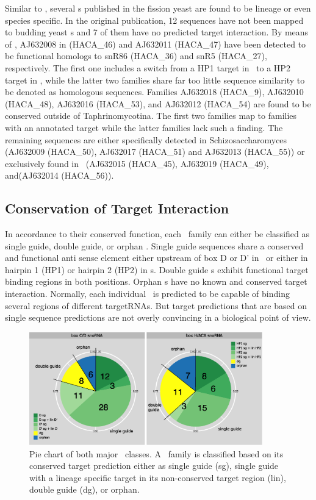 Similar to \calb, several \sno s published in the fission yeast
\cite{Li:2005} are found to be lineage or even species specific. In
the original publication, 12 sequences have not been mapped to budding
yeast \sno s and 7 of them have no predicted target interaction. By
means of \snostrip, AJ632008 in \cite{Li:2005} (HACA\_46) and AJ632011
(HACA\_47) have been detected to be functional homologs to snR86
(HACA\_36) and snR5 (HACA\_27), respectively. The first one includes a
switch from a HP1 target in \spo\ to a HP2 target in \sce, while the
latter two families share far too little sequence similarity to be
denoted as homologous sequences. Families AJ632018 (HACA\_9), AJ632010
(HACA\_48), AJ632016 (HACA\_53), and AJ632012 (HACA\_54) are found to
be conserved outside of Taphrinomycotina. The first two families map
to families with an annotated target while the latter families lack
such a finding. The remaining sequences are either specifically
detected in Schizosaccharomyces (AJ632009 (HACA\_50), AJ632017
(HACA\_51) and AJ632013 (HACA\_55)) or exclusively found in \spo\
(AJ632015 (HACA\_45), AJ632019 (HACA\_49), and(AJ632014 (HACA\_56)).

\subsection{Conservation of Target Interaction}

In accordance to their conserved function, each \sno\ family can
either be classified as single guide, double guide, or orphan
\sno. Single guide sequences share a conserved and functional anti
sense element either upstream of box D or D' in \cd\ or either in
hairpin 1 (HP1) or hairpin 2 (HP2) in \haca s. Double guide \sno s
exhibit functional target binding regions in both positions. Orphan
\sno s have no known and conserved target interaction. Normally, each
individual \sno\ is predicted to be capable of binding several regions
of different targetRNAs. But target predictions that are based on
single sequence predictions are not overly convincing in a biological
point of view.

\begin{figure}
  \centering
  \includegraphics[width=0.9\textwidth]{pics/pieCharts_snoRNAs_modified.eps}
  \caption[Classification of \sno\ families as single or double
  guides.]{Pie chart of both major \sno\ classes. A \sno\ family is
    classified based on its conserved target prediction either as
    single guide (sg), single guide with a lineage specific target in
    its non-conserved target region (lin), double guide (dg), or
    orphan.}
  \label{fig:pie_charts}
\end{figure}

